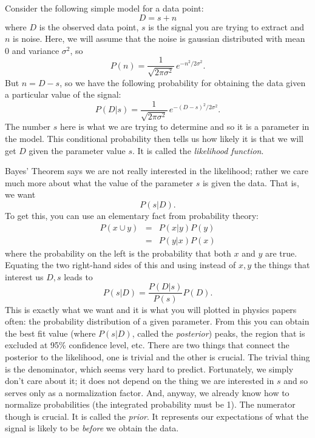 \documentclass[prd,amsmath,aps,floats,amssymb, floatfix,
  superscriptaddress,nofootinbib]{revtex4-1}
\newcommand{\eql}[1]{\label{eq:#1}}
\def\vs{\nonumber\\}
\numberwithin{equation}{section}
\newcommand\be{\begin{equation}}
\newcommand\ee{\end{equation}}
\def\bea{\begin{eqnarray}}
\def\eea{\end{eqnarray}}
\begin{document}
Consider the following simple model for a data point:
\be
D = s + n
\ee
where $D$ is the observed data point, $s$ is the signal you are trying to extract and $n$ is noise. Here, we will assume that the noise is gaussian distributed with mean 0 and variance $\sigma^2$, so
\be
P(n) = \frac{1}{\sqrt{2\pi\sigma^2}}\, e^{-n^2/2\sigma^2}.\ee
But $n=D-s$, so we have the following probability for obtaining the data given a particular value of the signal:
\be
P(D|s) =  \frac{1}{\sqrt{2\pi\sigma^2}} \, e^{-(D-s)^2/2\sigma^2}.\eql{like}\ee
The number $s$ here is what we are trying to determine and so it is a parameter in the model. This conditional probability then tells us how likely it is that we will get $D$ given the parameter value $s$. It is called the {\it likelihood function}.

Bayes' Theorem says we are not really interested in the likelihood; rather we care much more about what the value of the parameter $s$ is given the data. That is, we want
\be
P(s|D).\ee
To get this, you can use an elementary fact from probability theory:
\bea
P(x\cup y) &=& P(x|y) P(y)\vs
&=& P(y|x) P(x) 
\eea
where the probability on the left is the probability that both $x$ and $y$ are true. Equating the two right-hand sides of this and using instead of $x,y$ the things that interest us $D,s$ leads to
\be
P(s|D) = \frac{
P(D|s)}{ P(s)}{P(D)
}
.\ee
This is exactly what we want and it is what you will plotted in physics papers often: the probability distribution of a given parameter. From this you can obtain the best fit value (where $P(s|D)$, called the {\it posterior}) peaks, the region that is excluded at 95\% confidence level, etc. There are two things that connect the posterior to the likelihood, one is trivial and the other is crucial. The trivial thing is the denominator, which seems very hard to predict. Fortunately, we simply don't care about it; it does not depend on the thing we are interested in $s$ and so serves only as a normalization factor. And, anyway, we already know how to normalize probabilities (the integrated probability must be 1). The numerator though is crucial. It is called the {\it prior}. It represents our expectations of what the signal is likely to be {\it before} we obtain the data.
\end{document}
